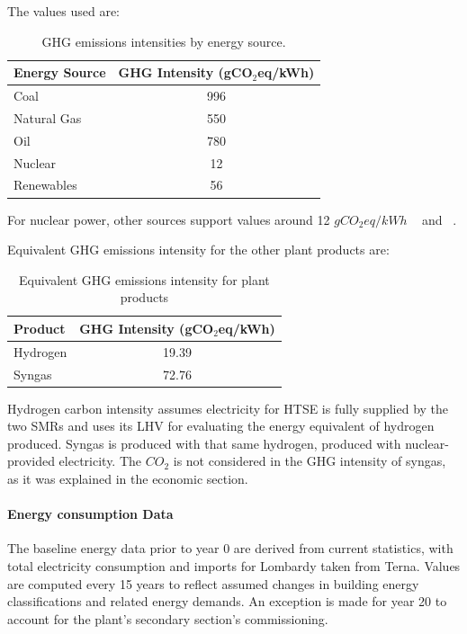 The values used are:

\begin{table}[H]
    \centering
    \begin{tabular}{lc}
        \toprule
        \textbf{Energy Source} & \textbf{GHG Intensity (gCO$_2$eq/kWh)} \\
        \midrule
        Coal        & 996 \\
        Natural Gas & 550 \\
        Oil         & 780 \\
        Nuclear     & 12 \\
        Renewables  & 56 \\
        \bottomrule
    \end{tabular}
    \caption{GHG emissions intensities by energy source.}
    \label{tab:ghg_intensity_sources}
\end{table}

For nuclear power, other sources support values around 12 $gCO_{2}eq/kWh$ ~\cite{vinoya2024life} and ~\cite{wang2019comparative}.

Equivalent GHG emissions intensity for the other plant products are:

\begin{table}[H]
    \centering
    \begin{tabular}{lc}
        \toprule
        \textbf{Product} & \textbf{GHG Intensity (gCO$_2$eq/kWh)} \\
        \midrule
        Hydrogen & 19.39 \\
        Syngas   & 72.76 \\
        \bottomrule
    \end{tabular}
    \caption{Equivalent GHG emissions intensity for plant products}
    \label{tab:plant_products_ghg}
\end{table}

Hydrogen carbon intensity assumes electricity for HTSE is fully supplied by the two SMRs and uses its LHV for evaluating the energy equivalent of hydrogen produced. Syngas is produced with that same hydrogen, produced with nuclear-provided electricity. The $CO_2$ is not considered in the GHG intensity of syngas, as it was explained in the economic section.

\paragraph{Energy consumption Data}
The baseline energy data prior to year 0 are derived from current statistics, with total electricity consumption and imports for Lombardy taken from Terna. Values are computed every 15 years to reflect assumed changes in building energy classifications and related energy demands. An exception is made for year 20 to account for the plant's secondary section's commissioning.


